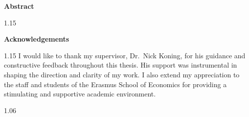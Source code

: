 \documentclass[11pt, a4paper]{article}
\begin{document}
\thispagestyle{empty}
\begin{center}
\begin{minipage}{0.80\textwidth}
\setlength{\parindent}{1.5em}
\begin{center}\large\bfseries Abstract\end{center}
\vspace{0.6em}
\begin{spacing}{1.15}
\noindent
\end{spacing}

\vspace{2.2em}
\begin{center}\bfseries Acknowledgements\end{center}
\vspace{0.4em}
\begin{spacing}{1.15}
\noindent I would like to thank my supervisor, Dr.\ Nick Koning, for his guidance
and constructive feedback throughout this thesis. His support was instrumental
in shaping the direction and clarity of my work. I also extend my appreciation
to the staff and students of the Erasmus School of Economics for providing a
stimulating and supportive academic environment.
\end{spacing}
\end{minipage}
\end{center}
\vfill

\newpage
\begin{spacing}{1.06}
\tableofcontents
\end{spacing}









\newpage
{}
\begingroup
\sloppy
\setlength{\emergencystretch}{3em}
\raggedright
{}
\setlength{\bibsep}{0.7em}
\fontsize{10}{12}\selectfont

\endgroup

\appendix

\end{document}
